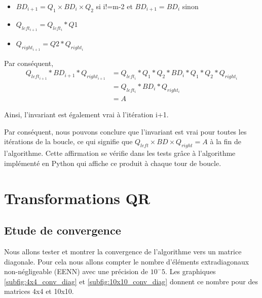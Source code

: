\documentclass{article}
\begin{document}
\begin{itemize}
  \item $BD_{i+1} = Q_{1} \times BD_{i} \times Q_{2}$ si i!=m-2 et $BD_{i+1} = BD_{i}$ sinon
  \item $Q_{left_{i+1}} = Q_{left_{i}} * Q1$
  \item $Q_{right_{i+1}} = Q2 * Q_{right_{i}}$
\end{itemize}

Par conséquent,
\begin{align}
  Q_{left_{i+1}} * BD_{i+1} * Q_{right_{i+1}} &= Q_{left_{i}} * Q_1 * Q_2 * BD_{i} * Q_1 * Q_2 * Q_{right_{i}} \\
                                          &= Q_{left_{i}} * BD_{i} * Q_{right_{i}} \\
                                          &= A
\end{align}


Ainsi, l'invariant est également vrai à l'itération i+1.

Par conséquent, nous pouvons conclure que l'invariant est vrai pour toutes les itérations de la boucle, ce qui signifie que $Q_{left} \times BD \times Q_{right} = A$ à la fin de l'algorithme.
Cette affirmation se vérifie dans les tests grâce à l'algorithme implémenté en Python qui affiche ce produit à chaque tour de boucle.

\section{Transformations QR}
\label{sec:transfo_qr}

\subsection{Etude de convergence}
\label{ssec:conv_qr}

Nous allons tester et montrer la convergence de l'algorithme vers un matrice diagonale. Pour cela nous allons compter le nombre d'éléments extradiagonaux non-négligeable (EENN) avec une précision de $10^-5$. Les graphiques \ref{subfig:4x4_conv_diag} et \ref{subfig:10x10_conv_diag} donnent ce nombre pour des matrices 4x4 et 10x10.
\end{document}
